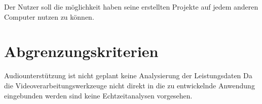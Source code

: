  Der Nutzer soll die möglichkeit haben seine erstellten Projekte auf jedem anderen Computer nutzen zu können.

\setcounter{enumi}{0}

\section{Abgrenzungskriterien}

 Audiounterstützung ist nicht geplant
 keine Analysierung der Leistungsdaten
 Da die Videoverarbeitungswerkzeuge nicht direkt in die zu entwickelnde Anwendung eingebunden werden sind keine Echtzeitanalysen vorgesehen.


\setcounter{enumi}{0}
